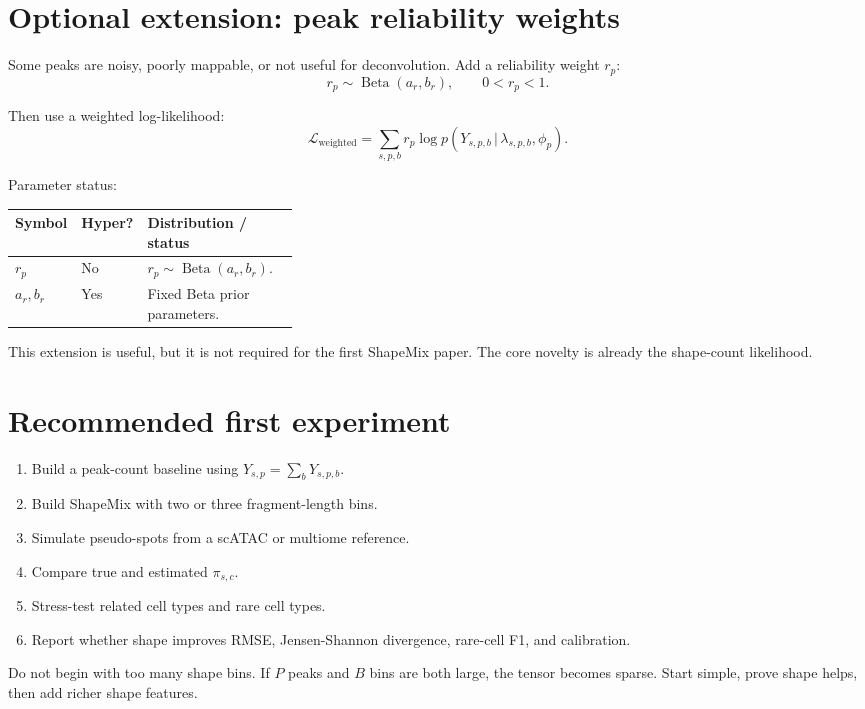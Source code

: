 \documentclass[11pt]{article}
\newcommand{\Betadist}{\operatorname{Beta}}
\newcommand{\given}{\,|\,}
\begin{document}
\section{Optional extension: peak reliability weights}

Some peaks are noisy, poorly mappable, or not useful for deconvolution.  Add a reliability weight \(r_p\):
\[
r_p \sim \Betadist(a_r,b_r),
\qquad 0<r_p<1.
\]

Then use a weighted log-likelihood:
\[
\mathcal{L}_{\mathrm{weighted}}
=\sum_{s,p,b} r_p\log p(Y_{s,p,b}\given\lambda_{s,p,b},\phi_p).
\]

Parameter status:

\begin{center}
\begin{tabularx}{\linewidth}{L{0.18\linewidth}C{0.15\linewidth}X}
\toprule
Symbol & Hyper? & Distribution / status \\
\midrule
\(r_p\) & No & \(r_p\sim\Betadist(a_r,b_r)\). \\
\(a_r,b_r\) & Yes & Fixed Beta prior parameters. \\
\bottomrule
\end{tabularx}
\end{center}

This extension is useful, but it is not required for the first ShapeMix paper.  The core novelty is already the shape-count likelihood.

\section{Recommended first experiment}

\begin{enumerate}[leftmargin=2em]
    \item Build a peak-count baseline using \(Y_{s,p}=\sum_b Y_{s,p,b}\).
    \item Build ShapeMix with two or three fragment-length bins.
    \item Simulate pseudo-spots from a scATAC or multiome reference.
    \item Compare true and estimated \(\pi_{s,c}\).
    \item Stress-test related cell types and rare cell types.
    \item Report whether shape improves RMSE, Jensen-Shannon divergence, rare-cell F1, and calibration.
\end{enumerate}

\begin{warningbox}
Do not begin with too many shape bins.  If \(P\) peaks and \(B\) bins are both large, the tensor becomes sparse.  Start simple, prove shape helps, then add richer shape features.
\end{warningbox}
\end{document}
